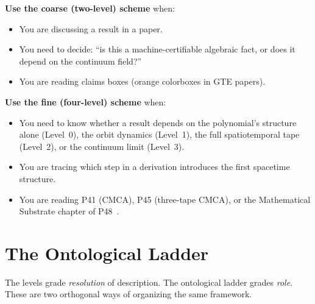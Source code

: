 \documentclass[11pt,a4paper]{article}
\begin{document}
\begin{tcolorbox}[colback=boxgray,colframe=gray!50!black,
  title=When to use which scheme]
\textbf{Use the coarse (two-level) scheme} when:
\begin{itemize}[itemsep=2pt]
  \item You are discussing a result in a paper.
  \item You need to decide: ``is this a machine-certifiable algebraic fact, or
    does it depend on the continuum field?''
  \item You are reading claims boxes (orange colorboxes in GTE papers).
\end{itemize}

\medskip\noindent
\textbf{Use the fine (four-level) scheme} when:
\begin{itemize}[itemsep=2pt]
  \item You need to know whether a result depends on the polynomial's
    structure alone (Level~0), the orbit dynamics (Level~1), the
    full spatiotemporal tape (Level~2), or the continuum limit (Level~3).
  \item You are tracing which step in a derivation introduces the
    first spacetime structure.
  \item You are reading P41 (CMCA), P45 (three-tape CMCA), or
    the Mathematical Substrate chapter of P48~\cite{SpivackGTECompleteFramework}.
\end{itemize}
\end{tcolorbox}

\section{The Ontological Ladder}
\label{sec:ladder}

The levels grade \emph{resolution} of description.
The ontological ladder grades \emph{role}.
These are two orthogonal ways of organizing the same framework.
\end{document}
